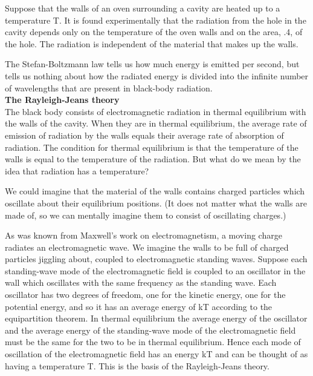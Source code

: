 \documentclass{../template/texnote}
\begin{document}
Suppose that the walls of an oven surrounding a cavity are heated up to a
temperature T. It is found experimentally that the radiation from the hole in
the cavity depends only on the temperature of the oven walls and on the area,
.4, of the hole. The radiation is independent of the material that makes up the
walls.

The Stefan-Boltzmann law tells us how much energy is emitted per second,
but tells us nothing about how the radiated energy is divided into the infinite
number of wavelengths that are present in black-body radiation.
\\

{\Large \textbf{The Rayleigh-Jeans theory} }\\


The black body consists of electromagnetic radiation in thermal equilibrium with
the walls of the cavity. When they are in thermal equilibrium, the average rate
of emission of radiation by the walls equals their average rate of absorption of
radiation. The condition for thermal equilibrium is that the temperature of the
walls is equal to the temperature of the radiation. But what do we mean by the
idea that radiation has a temperature?

We could imagine that the material of the walls contains charged particles
which oscillate about their equilibrium positions. (It does not matter what the
walls are made of, so we can mentally imagine them to consist of oscillating
charges.) 

As was known from Maxwell's work on electromagnetism, a 
moving charge  radiates an electromagnetic wave. We imagine the walls to be full
of charged particles jiggling about, coupled to electromagnetic standing waves.
Suppose each standing-wave mode of the electromagnetic field is coupled to an
oscillator in the wall which oscillates with the same frequency as the standing
wave.
Each oscillator has two degrees of freedom, one for the kinetic energy, one
for the potential energy, and so it has an average energy of kT according to the
equipartition theorem.
In thermal equilibrium the average energy of the 
oscillator and the average energy of the standing-wave mode of the electromagnetic
field must be the same for the two to be in thermal equilibrium. Hence each
mode of oscillation of the electromagnetic field has an energy kT and can be
thought of as having a temperature T. This is the basis of the Rayleigh-Jeans
theory.
\end{document}
